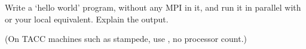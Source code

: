   \label{ex:hello1}
  Write a `hello world' program, without any MPI in it,
  and run it in parallel with  or your local equivalent.
  Explain the output.

\begin{tacc}
    (On TACC machines such as stampede, use , no
    processor count.)
\end{tacc}

